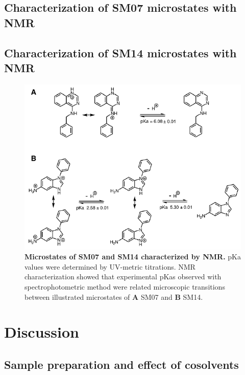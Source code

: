 \documentclass[9pt,lineno]{elife}
\begin{document}
\subsection{Characterization of SM07 microstates with NMR}

\subsection{Characterization of SM14 microstates with NMR}


\begin{figure}
\begin{center}
\includegraphics[width=0.75\linewidth]{figures/NMR_microstates_placeholder_figure.pdf}
\caption{{\bf Microstates of SM07 and SM14 characterized by NMR.} pKa values were determined by UV-metric titrations. NMR characterization showed that experimental pKas observed with spectrophotometric method were related microscopic transitions between illustrated microstates of \textbf{A} SM07 and \textbf{B} SM14. 
}
\label{fig:NMR_microstates}
\end{center}
\end{figure}

\section{Discussion}

\subsection{Sample preparation and effect of cosolvents}
\end{document}
